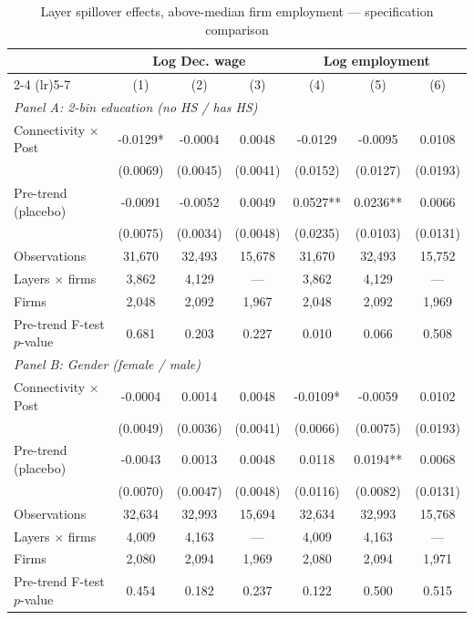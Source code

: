 \begin{table}[H]
\centering
\caption{Layer spillover effects, above-median firm employment --- specification comparison}
\label{tab:layer_specs_abvmed_firm}
\scriptsize
\begin{threeparttable}
\begin{tabular}{lcccccc}
\toprule\toprule
 & \multicolumn{3}{c}{Log Dec. wage} & \multicolumn{3}{c}{Log employment} \\
\cmidrule(lr){2-4} \cmidrule(lr){5-7}
 & (1) & (2) & (3) & (4) & (5) & (6) \\
\midrule
\multicolumn{7}{l}{\textit{Panel A: 2-bin education (no HS / has HS)}} \\
\quad Connectivity $\times$ Post & -0.0129* & -0.0004 & 0.0048 & -0.0129 & -0.0095 & 0.0108 \\
 & (0.0069) & (0.0045) & (0.0041) & (0.0152) & (0.0127) & (0.0193) \\
\quad Pre-trend (placebo) & -0.0091 & -0.0052 & 0.0049 & 0.0527** & 0.0236** & 0.0066 \\
 & (0.0075) & (0.0034) & (0.0048) & (0.0235) & (0.0103) & (0.0131) \\
\quad Observations & 31,670 & 32,493 & 15,678 & 31,670 & 32,493 & 15,752 \\
\quad Layers $\times$ firms & 3,862 & 4,129 & --- & 3,862 & 4,129 & --- \\
\quad Firms & 2,048 & 2,092 & 1,967 & 2,048 & 2,092 & 1,969 \\
\quad Pre-trend F-test $p$-value & 0.681 & 0.203 & 0.227 & 0.010 & 0.066 & 0.508 \\[6pt]
\multicolumn{7}{l}{\textit{Panel B: Gender (female / male)}} \\
\quad Connectivity $\times$ Post & -0.0004 & 0.0014 & 0.0048 & -0.0109* & -0.0059 & 0.0102 \\
 & (0.0049) & (0.0036) & (0.0041) & (0.0066) & (0.0075) & (0.0193) \\
\quad Pre-trend (placebo) & -0.0043 & 0.0013 & 0.0048 & 0.0118 & 0.0194** & 0.0068 \\
 & (0.0070) & (0.0047) & (0.0048) & (0.0116) & (0.0082) & (0.0131) \\
\quad Observations & 32,634 & 32,993 & 15,694 & 32,634 & 32,993 & 15,768 \\
\quad Layers $\times$ firms & 4,009 & 4,163 & --- & 4,009 & 4,163 & --- \\
\quad Firms & 2,080 & 2,094 & 1,969 & 2,080 & 2,094 & 1,971 \\
\quad Pre-trend F-test $p$-value & 0.454 & 0.182 & 0.237 & 0.122 & 0.500 & 0.515 \\[6pt]

\end{tabular}
\end{threeparttable}
\end{table}
